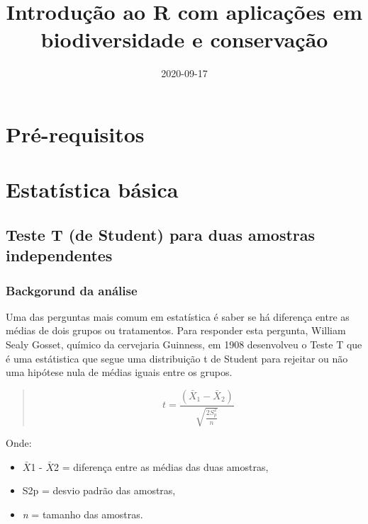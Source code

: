 \documentclass[
]{book}
\title{Introdução ao R com aplicações em biodiversidade e conservação}
\author{}
\date{\vspace{-2.5em}2020-09-17}
\begin{document}
\maketitle

{
\setcounter{tocdepth}{1}
\tableofcontents
}
\hypertarget{pruxe9-requisitos}{%
\chapter{Pré-requisitos}\label{pruxe9-requisitos}}

\hypertarget{estatuxedstica-buxe1sica}{%
\chapter{Estatística básica}\label{estatuxedstica-buxe1sica}}

\hypertarget{teste-t-de-student-para-duas-amostras-independentes}{%
\section{Teste T (de Student) para duas amostras independentes}\label{teste-t-de-student-para-duas-amostras-independentes}}

\hypertarget{backgorund-da-anuxe1lise}{%
\subsection{Backgorund da análise}\label{backgorund-da-anuxe1lise}}

Uma das perguntas mais comum em estatística é saber se há diferença entre as médias de dois grupos ou tratamentos. Para responder esta pergunta, William Sealy Gosset, químico da cervejaria Guinness, em 1908 desenvolveu o Teste T que é uma estátistica que segue uma distribuição t de Student para rejeitar ou não uma hipótese nula de médias iguais entre os grupos.

\begin{quote}
\[ t = \frac{(\bar{X}_1 - \bar{X}_2)}{\sqrt{\frac{2S^2_p}{n}}}\]
\end{quote}

Onde:

\begin{itemize}
\item
  \(\bar{X}\)1 - \(\bar{X}\)2 = diferença entre as médias das duas amostras,
\item
  S2p = desvio padrão das amostras,
\item
  \emph{n} = tamanho das amostras.
\end{itemize}
\end{document}
